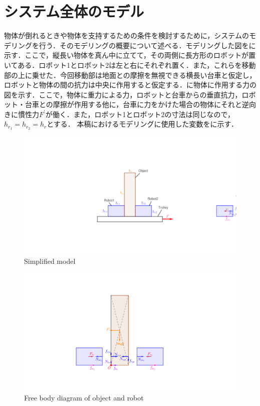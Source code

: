 \section{システム全体のモデル}
\label{section:modeling}
物体が倒れるときや物体を支持するための条件を検討するために，システムのモデリングを行う．そのモデリングの概要について述べる．モデリングした図をに示す．ここで，縦長い物体を真ん中に立てて，その両側に長方形のロボットが置いてある．ロボット1とロボット2は左と右にそれぞれ置く．また，これらを移動部の上に乗せた．今回移動部は地面との摩擦を無視できる横長い台車と仮定し，ロボットと物体の間の抗力は中央に作用すると仮定する．に物体に作用する力の図を示す．ここで，物体に重力による力，ロボットと台車からの垂直抗力，ロボット・台車との摩擦が作用する他に，台車に力をかけた場合の物体にそれと逆向きに慣性力$F^{\prime}$が働く．また，ロボット1とロボット2の寸法は同じなので，$h_{r_1}=h_{r_2}=h_{r}$とする．
本稿におけるモデリングに使用した変数をに示す．
\begin{figure}[tb]
  \centering
    \includegraphics[width=0.7\columnwidth]{./figure/carrybot-model.pdf}
    \caption{Simplified model}
\end{figure}
\begin{figure}[tb]
  \centering
    \includegraphics[width=0.7\columnwidth]{./figure/freebody-v2.pdf}
     \caption{Free body diagram of object and robot}
\end{figure}
   
